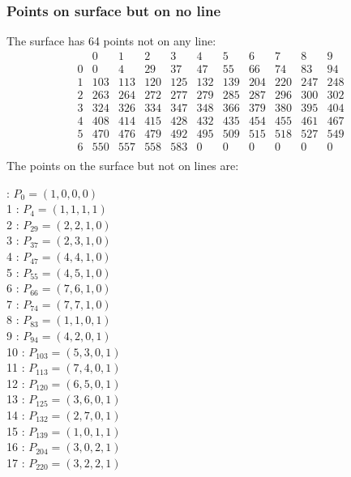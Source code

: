 \documentclass{article}
\begin{document}
{\subsubsection*{Points on surface but on no line}
The surface has 64 points not on any line:\\
$$
\begin{array}{r|*{10}{r}}
 & 0 & 1 & 2 & 3 & 4 & 5 & 6 & 7 & 8 & 9\\
\hline
0 & 0 & 4 & 29 & 37 & 47 & 55 & 66 & 74 & 83 & 94\\
1 & 103 & 113 & 120 & 125 & 132 & 139 & 204 & 220 & 247 & 248\\
2 & 263 & 264 & 272 & 277 & 279 & 285 & 287 & 296 & 300 & 302\\
3 & 324 & 326 & 334 & 347 & 348 & 366 & 379 & 380 & 395 & 404\\
4 & 408 & 414 & 415 & 428 & 432 & 435 & 454 & 455 & 461 & 467\\
5 & 470 & 476 & 479 & 492 & 495 & 509 & 515 & 518 & 527 & 549\\
6 & 550 & 557 & 558 & 583 & 0 & 0 & 0 & 0 & 0 & 0\\
\end{array}
$$
The points on the surface but not on lines are:\\
\begin{multicols}{2}
 : $P_{0}=( 1, 0, 0, 0 )$\\
1 : $P_{4}=( 1, 1, 1, 1 )$\\
2 : $P_{29}=( 2, 2, 1, 0 )$\\
3 : $P_{37}=( 2, 3, 1, 0 )$\\
4 : $P_{47}=( 4, 4, 1, 0 )$\\
5 : $P_{55}=( 4, 5, 1, 0 )$\\
6 : $P_{66}=( 7, 6, 1, 0 )$\\
7 : $P_{74}=( 7, 7, 1, 0 )$\\
8 : $P_{83}=( 1, 1, 0, 1 )$\\
9 : $P_{94}=( 4, 2, 0, 1 )$\\
10 : $P_{103}=( 5, 3, 0, 1 )$\\
11 : $P_{113}=( 7, 4, 0, 1 )$\\
12 : $P_{120}=( 6, 5, 0, 1 )$\\
13 : $P_{125}=( 3, 6, 0, 1 )$\\
14 : $P_{132}=( 2, 7, 0, 1 )$\\
15 : $P_{139}=( 1, 0, 1, 1 )$\\
16 : $P_{204}=( 3, 0, 2, 1 )$\\
17 : $P_{220}=( 3, 2, 2, 1 )$\\

\end{multicols}}
\end{document}

